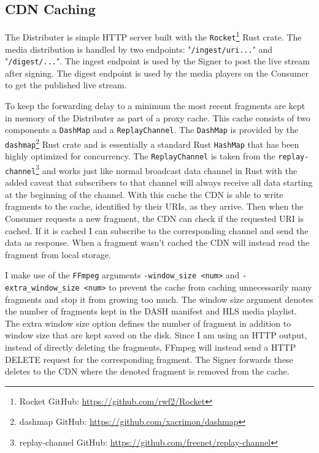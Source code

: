 \subsection{CDN Caching\label{sec:caching}}

The Distributer is simple HTTP server built with the \texttt{Rocket}\footnote{Rocket GitHub: \url{https://github.com/rwf2/Rocket}} Rust crate. The media distribution is handled by two endpoints: "\texttt{/ingest/uri...}" and "\texttt{/digest/...}". The ingest endpoint is used by the Signer to post the live stream after signing. The digest endpoint is used by the media players on the Consumer to get the published live stream.

To keep the forwarding delay to a minimum the most recent fragments are kept in memory of the Distributer as part of a proxy cache. This cache consists of two components a \texttt{DashMap} and a \texttt{ReplayChannel}. The \texttt{DashMap} is provided by the \texttt{dashmap}\footnote{dashmap GitHub: \url{https://github.com/xacrimon/dashmap}} Rust crate and is essentially a standard Rust \texttt{HashMap} that has been highly optimized for concurrency. The \texttt{ReplayChannel} is taken from the \texttt{replay-channel}\footnote{replay-channel GitHub: \url{https://github.com/freenet/replay-channel}} and works just like normal broadcast data channel in Rust with the added caveat that subscribers to that channel will always receive all data starting at the beginning of the channel. With this cache the CDN is able to write fragments to the cache, identified by their URIs, as they arrive. Then when the Consumer requests a new fragment, the CDN can check if the requested URI is cached. If it is cached I can subscribe to the corresponding channel and send the data as response. When a fragment wasn't cached the CDN will instead read the fragment from local storage.

I make use of the \texttt{FFmpeg} arguments \texttt{-window\_size <num>} and \texttt{-extra\_window\_size <num>} to prevent the cache from caching unnecessarily many fragments and stop it from growing too much. The window size argument denotes the number of fragments kept in the DASH manifest and HLS media playlist. The extra window size option defines the number of fragment in addition to window size that are kept saved on the disk. Since I am using an HTTP output, instead of directly deleting the fragments, FFmpeg will instead send a HTTP DELETE request for the corresponding fragment. The Signer forwards these deletes to the CDN where the denoted fragment is removed from the cache.

